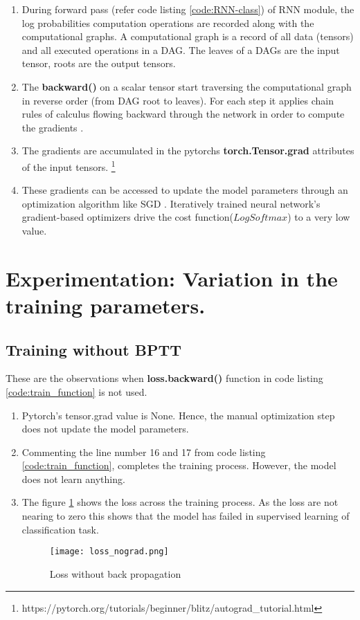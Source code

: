 \begin{enumerate}
    \item During forward pass (refer code listing \ref{code:RNN-class}) of \acs{RNN} module, the log probabilities computation operations are recorded along with the computational graphs. A computational graph is a record of all data (tensors) and all executed operations in a \acf{DAG}. The leaves of a \acsp{DAG} are the input tensor, roots are the output tensors. 
    \item The \textbf{backward()} on a scalar tensor start traversing the computational graph in reverse order (from \acs{DAG} root to leaves). For each step it applies chain rules of calculus flowing backward through the network in order to compute the gradients \parencite[section 6.5.2]{Goodfellow-et-al-2016}.
    \item  The gradients are accumulated in the pytorchs  \textbf{torch.Tensor.grad} attributes of the input tensors. \footnote{https://pytorch.org/tutorials/beginner/blitz/autograd\_tutorial.html}
    \item These gradients can be accessed to update the model parameters through an optimization algorithm  like \acf{SGD} . Iteratively trained neural network's  gradient-based optimizers drive the cost function($LogSoftmax$) to a very low value. 
\end{enumerate}

\clearpage

\section{Experimentation: Variation in the training parameters.}

\subsection{Training without \acs{BPTT}}

These are the observations when \textbf{loss.backward()} function in code listing \ref{code:train_function} is not used.

\begin{enumerate}
    \item Pytorch's tensor.grad value is None. Hence, the manual optimization step does not update the model parameters.
    \item Commenting the line number 16 and 17 from code listing \ref{code:train_function}, completes the training process. However, the model does not learn anything.  
    \item The figure \ref{fig:nograd} shows the loss across the training process. As the loss are not nearing to zero this shows that the model has failed in supervised learning of classification task.
    \begin{figure}[H]
        \centering    
        \texttt{[image: loss\_nograd.png]}
        \caption{Loss without back propagation}
        \label{fig:nograd}
    \end{figure}
    
\end{enumerate}


